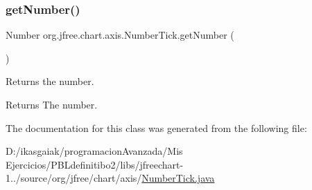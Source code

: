 \subsubsection{\texorpdfstring{get\+Number()}{getNumber()}}
{\footnotesize\ttfamily Number org.\+jfree.\+chart.\+axis.\+Number\+Tick.\+get\+Number (\begin{DoxyParamCaption}{ }\end{DoxyParamCaption})}

Returns the number.

\begin{DoxyReturn}{Returns}
The number. 
\end{DoxyReturn}


The documentation for this class was generated from the following file\+:\begin{DoxyCompactItemize}
\item 
D\+:/ikasgaiak/programacion\+Avanzada/\+Mis Ejercicios/\+P\+B\+Ldefinitibo2/libs/jfreechart-\/1../source/org/jfree/chart/axis/\mbox{\hyperlink{_number_tick_8java}{Number\+Tick.\+java}}\end{DoxyCompactItemize}
